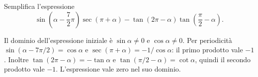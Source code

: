 
\begin{esercizio}
Semplifica l'espressione
    \[
    \sin\left(\alpha-\frac{7}{2}\pi\right)\operatorname{sec}(\pi+\alpha)
    -\tan(2\pi-\alpha)\tan\left(\frac{\pi}{2}-\alpha\right).
    \]
\end{esercizio}

\begin{soluzione}
Il dominio dell'espressione iniziale è $\sin\alpha\ne0$ e $\cos\alpha\ne0$.
Per periodicità $\sin(\alpha-7\pi/2)=\cos\alpha$ e $\sec(\pi+\alpha)=-1/\cos\alpha$:
il primo prodotto vale $-1$. Inoltre $\tan(2\pi-\alpha)=-\tan\alpha$ e
$\tan(\pi/2-\alpha)=\cot\alpha$, quindi il secondo prodotto vale $-1$.
L'espressione vale zero nel suo dominio.
\end{soluzione}
